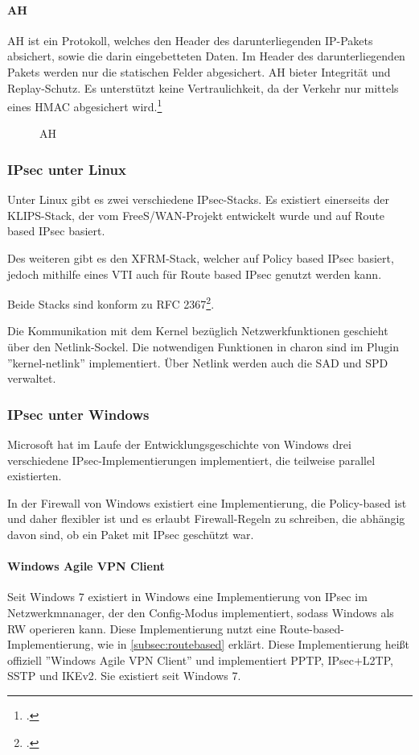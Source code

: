 \paragraph{AH}
\ac{AH} ist ein Protokoll, welches den Header des darunterliegenden \ac{IP}-Pakets absichert,
sowie die darin eingebetteten Daten. Im Header des darunterliegenden Pakets werden nur die statischen Felder
abgesichert. \ac{AH} bieter Integrität und Replay-Schutz. Es unterstützt keine Vertraulichkeit, da
der Verkehr nur mittels eines \ac{HMAC} abgesichert wird.\footcite[][]{stephen_kent_rfc_2005-1}
\begin{figure}
    \label{fig:AH}
    \centering
    \def\svgwidth{\columnwidth}
    
    \caption{\ac{AH}}
\end{figure}

\subsubsection{IPsec unter Linux}
Unter Linux gibt es zwei verschiedene \ac{IPsec}-Stacks.
Es existiert einerseits der KLIPS-Stack, der vom FreeS/WAN-Projekt entwickelt wurde
und auf Route based IPsec basiert.

Des weiteren gibt es den XFRM-Stack, welcher auf Policy based IPsec basiert, jedoch mithilfe eines \ac{VTI}
auch für Route based IPsec genutzt werden kann.

Beide Stacks sind konform zu RFC 2367\footcite[][]{daniel_l._mcdonald_rfc_1998}.

Die Kommunikation mit dem Kernel bezüglich Netzwerkfunktionen geschieht über
den Netlink-Sockel. Die notwendigen Funktionen in charon sind im Plugin ''kernel-netlink'' implementiert.
Über Netlink werden auch die \ac{SAD} und \ac{SPD} verwaltet.

\subsubsection{IPsec unter Windows}
Microsoft hat im Laufe der Entwicklungsgeschichte von Windows drei verschiedene
\ac{IPsec}-Implementierungen implementiert, die teilweise parallel existierten.


In der Firewall von Windows existiert eine Implementierung, die Policy-based ist
und daher flexibler ist und es erlaubt Firewall-Regeln zu schreiben, die abhängig davon sind,
ob ein Paket mit \ac{IPsec} geschützt war.

\paragraph{Windows Agile VPN Client}
Seit Windows 7 existiert in Windows eine Implementierung von \ac{IPsec} im Netzwerkmnanager,
der den Config-Modus implementiert, sodass Windows als \ac{RW} operieren kann.
Diese Implementierung nutzt eine Route-based-Implementierung, wie in \autoref{subsec:routebased}
erklärt. Diese Implementierung heißt offiziell ''Windows Agile VPN Client'' und
implementiert \ac{PPTP}, \ac{IPsec}+\ac{L2TP}, \ac{SSTP} und \ac{IKE}v2. Sie existiert seit Windows 7.

